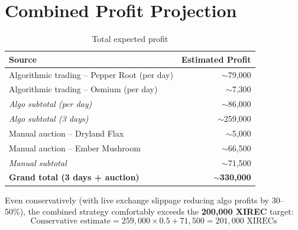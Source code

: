 \documentclass[11pt,a4paper]{article}
\begin{document}
\section{Combined Profit Projection}

\begin{table}[H]
\centering
\caption{Total expected profit}
\begin{tabular}{@{}lr@{}}
\toprule
\textbf{Source} & \textbf{Estimated Profit} \\
\midrule
Algorithmic trading -- Pepper Root (per day) & $\sim$79,000 \\
Algorithmic trading -- Osmium (per day)      & $\sim$7,300 \\
\textit{Algo subtotal (per day)}             & $\sim$86,000 \\
\textit{Algo subtotal (3 days)}              & $\sim$259,000 \\
\midrule
Manual auction -- Dryland Flax               & $\sim$5,000 \\
Manual auction -- Ember Mushroom             & $\sim$66,500 \\
\textit{Manual subtotal}                     & $\sim$71,500 \\
\midrule
\textbf{Grand total (3 days + auction)}      & $\sim$\textbf{330,000} \\
\bottomrule
\end{tabular}
\end{table}

Even conservatively (with live exchange slippage reducing algo profits by 30--50\%), the combined strategy comfortably exceeds the \textbf{200,000 XIREC} target:
\begin{equation}
    \text{Conservative estimate} = 259{,}000 \times 0.5 + 71{,}500 = 201{,}000 \text{ XIRECs}
\end{equation}
\end{document}
